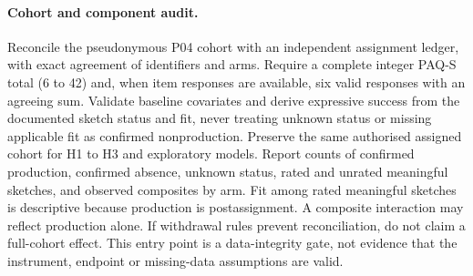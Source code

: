 \documentclass[11pt,a4paper]{article}
\begin{document}
\paragraph{Cohort and component audit.} Reconcile the pseudonymous P04 cohort with an independent assignment ledger, with exact agreement of identifiers and arms. Require a complete integer PAQ-S total (6 to 42) and, when item responses are available, six valid responses with an agreeing sum. Validate baseline covariates and derive expressive success from the documented sketch status and fit, never treating unknown status or missing applicable fit as confirmed nonproduction. Preserve the same authorised assigned cohort for H1 to H3 and exploratory models. Report counts of confirmed production, confirmed absence, unknown status, rated and unrated meaningful sketches, and observed composites by arm. Fit among rated meaningful sketches is descriptive because production is postassignment. A composite interaction may reflect production alone. If withdrawal rules prevent reconciliation, do not claim a full-cohort effect. This entry point is a data-integrity gate, not evidence that the instrument, endpoint or missing-data assumptions are valid.

\printbibliography
\end{document}
